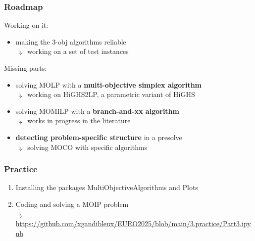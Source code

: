 \documentclass[]{beamer}
\begin{document}
\begin{frame}
  \frametitle{Roadmap}
\vspace{3mm}

Working on it:

\begin{itemize}
\item making the 3-obj algorithms reliable\\
$\drsh$ working on a set of test instances
\end{itemize}
\bigskip
\pause

Missing parts:

\begin{itemize}
\item solving MOLP with a  \textbf{multi-objective simplex algorithm}\\
$\drsh$ working on HiGHS2LP, a parametric variant of HiGHS
\smallskip
\item solving MOMILP with a  \textbf{branch-and-xx algorithm}\\
$\drsh$ works in progress in the literature 
\smallskip
\item \textbf{detecting problem-specific structure} in a presolve\\
$\drsh$ solving MOCO with specific algorithms 
\end{itemize}


\end{frame}




% 
%

\begin{frame}
  \frametitle{Practice}
\vspace{3mm}

\begin{enumerate}
\item Installing the packages MultiObjectiveAlgorithms and Plots

\item Coding and solving a MOIP problem \\
$\drsh$ \tiny{\url{https://github.com/xgandibleux/EURO2025/blob/main/3.practice/Part3.ipynb}}
\vspace{3mm}

\end{enumerate}
\end{frame}


% 
%
\end{document}
